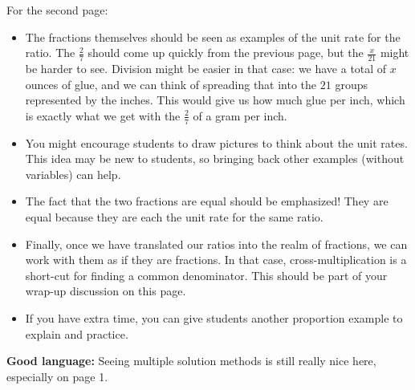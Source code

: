 \documentclass[nooutcomes,noauthor,handout]{ximera}
\begin{document}
\begin{instructorNotes}
For the second page:
\begin{itemize}
	\item The fractions themselves should be seen as examples of the unit rate for the ratio. The $\frac{2}{7}$ should come up quickly from the previous page, but the $\frac{x}{21}$ might be harder to see. Division might be easier in that case: we have a total of $x$ ounces of glue, and we can think of spreading that into the $21$ groups represented by the inches. This would give us how much glue per inch, which is exactly what we get with the $\frac{2}{7}$ of a gram per inch.
	\item You might encourage students to draw pictures to think about the unit rates. This idea may be new to students, so bringing back other examples (without variables) can help.
	\item The fact that the two fractions are equal should be emphasized! They are equal because they are each the unit rate for the same ratio.
	\item Finally, once we have translated our ratios into the realm of fractions, we can work with them as if they are fractions. In that case, cross-multiplication is a short-cut for finding a common denominator. This should be part of your wrap-up discussion on this page.
	\item If you have extra time, you can give students another proportion example to explain and practice.
\end{itemize}




{\bf Good language:} Seeing multiple solution methods is still really nice here, especially on page 1.






\end{instructorNotes}
\end{document}

